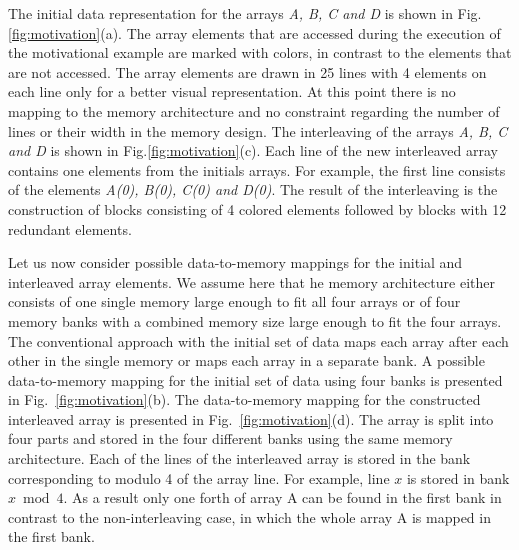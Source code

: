 The initial data representation for the arrays \textit{A, B, C and D} is shown in Fig.\ref{fig:motivation}(a). 
The array elements that are accessed during the execution of the motivational example are marked with colors, in contrast to the elements that are not accessed.
The array elements are drawn in 25 lines with 4 elements on each line only for a better visual representation.
At this point there is no mapping to the memory architecture and no constraint regarding the number of lines or their width in the memory design.
The interleaving of the arrays \textit{A, B, C and D} is shown in Fig.\ref{fig:motivation}(c). 
Each line of the new interleaved array contains one elements from the initials arrays.
For example, the first line consists of the elements \textit{A(0), B(0), C(0) and D(0)}. 
The result of the interleaving is the construction of blocks consisting of 4 colored elements followed by blocks with 12 redundant elements.

Let us now consider possible data-to-memory mappings for the initial and interleaved array elements.
We assume here that he memory architecture either consists of one single memory large enough to fit all four arrays or of four memory banks with a combined memory size large enough to fit the four arrays.
The conventional approach with the initial set of data maps each array after each other in the single memory or maps each array in a separate bank.
A possible data-to-memory mapping for the initial set of data using four banks is presented in Fig.~\ref{fig:motivation}(b). 
The data-to-memory mapping for the constructed interleaved array is presented in Fig.~\ref{fig:motivation}(d).
The array is split into four parts and stored in the four different banks using the same memory architecture.
Each of the lines of the interleaved array is stored in the bank corresponding to modulo 4 of the array line.
For example, line $x$ is stored in bank $x \bmod 4$.
As a result only one forth of array A can be found in the first bank in contrast to the non-interleaving case, in which the whole array A is mapped in the first bank.

